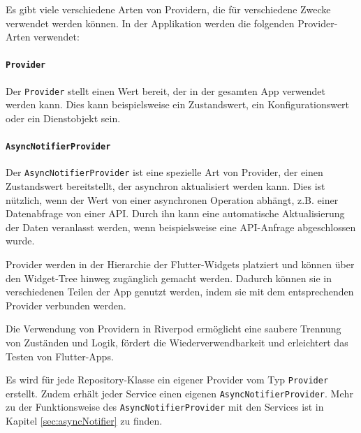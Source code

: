 \documentclass{entwurfsheft}
\begin{document}
\begin{sloppypar}
Es gibt viele verschiedene Arten von Providern, die für verschiedene Zwecke verwendet werden können. In der Applikation werden die folgenden Provider-Arten verwendet:

\paragraph{\texttt{Provider}}
Der \texttt{Provider} stellt einen Wert bereit, der in der gesamten App verwendet werden kann. Dies kann beispielsweise ein Zustandswert, ein Konfigurationswert oder ein Dienstobjekt sein.

\paragraph{\texttt{AsyncNotifierProvider}}
Der \texttt{AsyncNotifierProvider} ist eine spezielle Art von Provider, der einen Zustandswert bereitstellt, der asynchron aktualisiert werden kann. Dies ist nützlich, wenn der Wert von einer asynchronen Operation abhängt, z.B. einer Datenabfrage von einer API. Durch ihn kann eine automatische Aktualisierung der Daten veranlasst werden, wenn beispielsweise eine API-Anfrage abgeschlossen wurde.

Provider werden in der Hierarchie der Flutter-Widgets platziert und können über den Widget-Tree hinweg zugänglich gemacht werden. Dadurch können sie in verschiedenen Teilen der App genutzt werden, indem sie mit dem entsprechenden Provider verbunden werden.

Die Verwendung von Providern in Riverpod ermöglicht eine saubere Trennung von Zuständen und Logik, fördert die Wiederverwendbarkeit und erleichtert das Testen von Flutter-Apps.

Es wird für jede Repository-Klasse ein eigener Provider vom Typ \texttt{Provider} erstellt. Zudem erhält jeder Service einen eigenen \texttt{AsyncNotifierProvider}. Mehr zu der Funktionsweise des \texttt{AsyncNotifierProvider} mit den Services ist in Kapitel \ref{sec:asyncNotifier} zu finden.

\newpage

\end{sloppypar}
\end{document}
